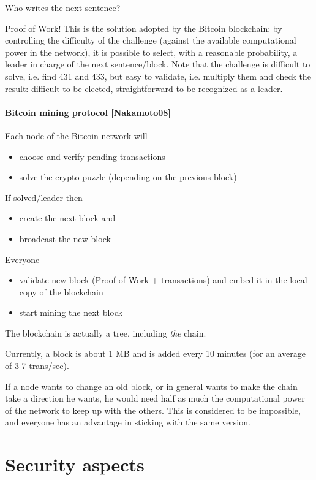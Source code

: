 Who writes the next sentence?

Proof of Work! This is the solution adopted by the Bitcoin blockchain: by controlling the difficulty of the challenge (against the available computational power in the network), it is possible to select, with a reasonable probability, a leader in charge of the next sentence/block. Note that the challenge is difficult to solve, i.e. find 431 and 433, but easy to validate, i.e. multiply them and check the result: difficult to be elected, straightforward to be recognized as a leader.

\paragraph*{Bitcoin mining protocol [Nakamoto08]}
Each node of the Bitcoin network will
\begin{itemize}
	\item choose and verify pending transactions
	\item solve the crypto-puzzle (depending on the previous block)
\end{itemize}

If solved/leader then
\begin{itemize}
	\item create the next block and
	\item broadcast the new block
\end{itemize}

Everyone
\begin{itemize}
	\item validate new block (Proof of Work + transactions) and embed it in the local copy of the blockchain
	\item start mining the next block
\end{itemize}

The blockchain is actually a tree, including \emph{the} chain.

Currently, a block is about 1 MB and is added every 10 minutes (for an average of 3-7 trans/sec).

If a node wants to change an old block, or in general wants to make the chain take a direction he wants, he would need half as much the computational power of the network to keep up with the others. This is considered to be impossible, and everyone has an advantage in sticking with the same version.

\section{Security aspects}

